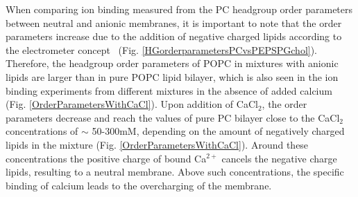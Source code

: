 \documentclass[journal=jpcbfk]{achemso}
\begin{document}
When comparing ion binding measured from the PC headgroup order parameters between
neutral and anionic membranes, it is important to note that the order parameters
increase due to the addition of negative charged lipids according to the electrometer
concept~\cite{seelig87, scherer87} (Fig. \ref{HGorderparametersPCvsPEPSPGchol}).
Therefore, the headgroup order parameters of POPC in mixtures with anionic
lipids are larger than in pure POPC lipid bilayer, which is also seen in the ion binding
experiments from different mixtures in the absence of added calcium (Fig. \ref{OrderParametersWithCaCl}).
Upon addition of CaCl$_2$, the order parameters decrease and reach the values of pure PC bilayer close 
to the CaCl$_2$ concentrations of $\sim$ 50-300mM, depending on the amount of negatively charged
lipids in the mixture (Fig. \ref{OrderParametersWithCaCl}).
Around these concentrations the positive charge of bound Ca$^{2+}$ cancels
the negative charge lipids, resulting to a neutral membrane. 
Above such concentrations, the specific binding of calcium leads to
the overcharging of the membrane.
\end{document}
